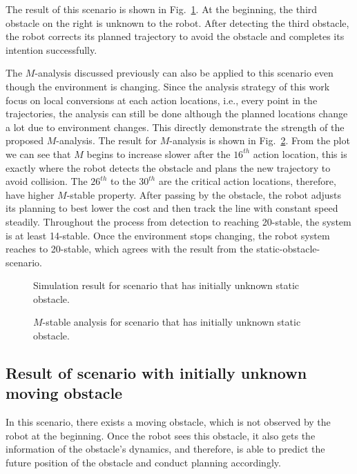 \documentclass[letterpaper, 10 pt, conference]{ieeeconf}  %
\begin{document}
The result of this scenario is shown in Fig.~\ref{fig:2_1}. At the beginning, the third obstacle on the right is unknown to the robot. After detecting the third obstacle, the robot corrects its planned trajectory to avoid the obstacle and completes its intention successfully.

The $M$-analysis discussed previously can also be applied to this scenario even though the environment is changing. Since the analysis strategy of this work focus on local conversions at each action locations, i.e., every point in the trajectories, the analysis can still be done although the planned locations change a lot due to environment changes. This directly demonstrate the strength of the proposed $M$-analysis. The result for $M$-analysis is shown in Fig.~\ref{fig:2_2}. From the plot we can see that $M$ begins to increase slower after the $16^{th}$ action location, this is exactly where the robot detects the obstacle and plans the new trajectory to avoid collision. The $26^{th}$ to the $30^{th}$ are the critical action locations, therefore, have higher $M$-stable property. After passing by the obstacle, the robot adjusts its planning to best lower the cost and then track the line with constant speed steadily. Throughout the process from detection to reaching 20-stable, the system is at least 14-stable. Once the environment stops changing, the robot system reaches to 20-stable, which agrees with the result from the static-obstacle-scenario.     




\begin{figure}[t]
      \centering
      
      \caption{Simulation result for scenario that has initially unknown static obstacle.}
      \label{fig:2_1}
\end{figure}


\begin{figure}[t]
      \centering
      
      \caption{$M$-stable analysis for scenario that has initially unknown static obstacle. }
      \label{fig:2_2}
\end{figure}





\subsection{Result of scenario with initially unknown moving obstacle}
In this scenario, there exists a moving obstacle, which is not observed by the robot at the beginning. Once the robot sees this obstacle, it also gets the information of the obstacle's dynamics, and therefore, is able to predict the future position of the obstacle and conduct planning accordingly. 
\end{document}
